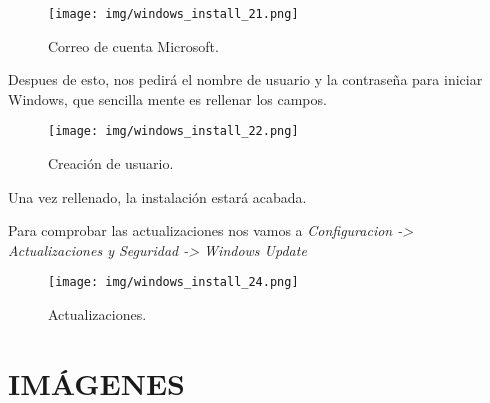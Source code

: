 \documentclass[12pt]{article}
\begin{document}
      \begin{figure}[h]
        \centering
        \texttt{[image: img/windows\_install\_21.png]}
        \caption{Correo de cuenta Microsoft.}
        \label{Windows11}
      \end{figure}

      Despues de esto, nos pedirá el nombre de usuario y la contraseña para iniciar Windows, que sencilla mente es rellenar los campos.

      \begin{figure}[h]
        \centering
        \texttt{[image: img/windows\_install\_22.png]}
        \caption{Creación de usuario.}
        \label{Windows12}
      \end{figure}

      Una vez rellenado, la instalación estará acabada.

      \newpage

      Para comprobar las actualizaciones nos vamos a \textit{Configuracion -> Actualizaciones y Seguridad -> Windows Update}

      \begin{figure}[h]
        \centering
        \texttt{[image: img/windows\_install\_24.png]}
        \caption{Actualizaciones.}
        \label{Windows13}
      \end{figure}


    \newpage

    \section{IMÁGENES}
    \listoffigures
      
\end{document}
